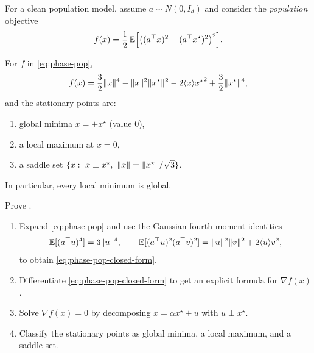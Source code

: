 \documentclass[11pt]{article}
\begin{document}
For a clean population model, assume $a\sim N(0,I_d)$ and consider the \emph{population} objective
\begin{equation}
  f(x)=\frac12\,\mathbb{E}\Big[\big((a^\top x)^2 - (a^\top x^\star)^2\big)^2\Big].
  \label{eq:phase-pop}
\end{equation}

\begin{proposition}
\label{prop:phase-retrieval-benign}
For $f$ in \eqref{eq:phase-pop},
\begin{equation}
  f(x)
  =\frac{3}{2}\lVert x\rVert^4 - \lVert x\rVert^2\lVert x^\star\rVert^2 - 2\langle x\rangle{x^\star}^2 + \frac{3}{2}\lVert x^\star\rVert^4,
  \label{eq:phase-pop-closed-form}
\end{equation}
and the stationary points are:
\begin{enumerate}[leftmargin=*]
  \item global minima $x=\pm x^\star$ (value $0$),
  \item a local maximum at $x=0$,
  \item a saddle set $\{x:\ x\perp x^\star,\ \norm{x}=\norm{x^\star}/\sqrt{3}\}$.
\end{enumerate}
In particular, every local minimum is global.
\end{proposition}

\begin{exercise}
\label{ex:phase-pop-derivation}
Prove .
\begin{enumerate}[leftmargin=*]
  \item Expand \eqref{eq:phase-pop} and use the Gaussian fourth-moment identities
  \[
  \mathbb{E}[(a^\top u)^4]=3\lVert u\rVert^4,
  \qquad
  \mathbb{E}[(a^\top u)^2(a^\top v)^2]=\lVert u\rVert^2\lVert v\rVert^2 + 2\langle u\rangle{v}^2,
  \]
  to obtain \eqref{eq:phase-pop-closed-form}.
  \item Differentiate \eqref{eq:phase-pop-closed-form} to get an explicit formula for $\nabla f(x)$.
  \item Solve $\nabla f(x)=0$ by decomposing $x=\alpha x^\star + u$ with $u\perp x^\star$.
  \item Classify the stationary points as global minima, a local maximum, and a saddle set.
\end{enumerate}
\end{exercise}
\end{document}
